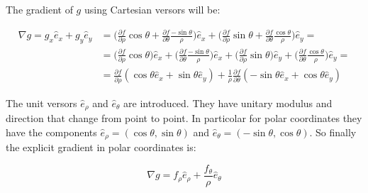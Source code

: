 	The gradient of $g$ using Cartesian versors will be:

	\begin{align*}
		\nabla g = g_x\hat{e}_x + g_y\hat{e}_y 
		    &= \biggl(\frac{\partial f}{\partial\rho}\cos\theta + \frac{\partial f}{\partial \theta}\frac{-\sin\theta}{\rho}\biggr)\hat{e}_x +\biggl(\frac{\partial f}{\partial\rho}\sin\theta + \frac{\partial f}{\partial \theta}\frac{\cos\theta}{\rho}\biggr)\hat{e}_y=\\
		    &=\biggl(\frac{\partial f}{\partial\rho}\cos\theta\biggr)\hat{e}_x + \biggl(\frac{\partial f}{\partial \theta}\frac{-\sin\theta}{\rho}\biggr)\hat{e}_x +\biggl(\frac{\partial f}{\partial\rho}\sin\theta\biggr)\hat{e}_y + \biggl(\frac{\partial f}{\partial \theta}\frac{\cos\theta}{\rho}\biggr)\hat{e}_y=\\
		    &=\frac{\partial f}{\partial\rho}(\cos\theta\hat{e}_x + \sin\theta\hat{e}_y) + \frac{1}{\rho}\frac{\partial f}{\partial\theta}(-\sin\theta\hat{e}_x + \cos\theta\hat{e}_y)
	\end{align*}

	The unit versors $\hat{e}_\rho$ and $\hat{e}_\theta$ are introduced.
	They have unitary modulus and direction that change from point to point.
	In particolar for polar coordinates they have the components $\hat{e}_\rho = (\cos\theta, \sin\theta)$ and $\hat{e}_\theta = (-\sin\theta, \cos\theta)$.
	So finally the explicit gradient in polar coordinates is:

	$$\nabla g = f_\rho\hat{e}_\rho + \frac{f_\theta}{\rho}\hat{e}_\theta$$

